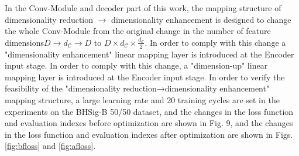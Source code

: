 In the Conv-Module and decoder part of this work, the mapping structure of dimensionality reduction $\to$ dimensionality enhancement is designed to change the whole Conv-Module from the original change in the number of feature dimensions$ D \to d_\mathcal{C} \to D$ to $D \times d_\mathcal{C} \times \frac{d_\mathcal{C}}{2}$. In order to comply with this change a "dimensionality enhancement" linear mapping layer is introduced at the Encoder input stage. In order to comply with this change, a "dimension-up" linear mapping layer is introduced at the Encoder input stage. In order to verify the feasibility of the "dimensionality reduction→dimensionality enhancement" mapping structure, a large learning rate and 20 training cycles are set in the experiments on the BHSig-B 50/50 dataset, and the changes in the loss function and evaluation indexes before optimization are shown in Fig. 9, and the changes in the loss function and evaluation indexes after optimization are shown in Figs. \ref{fig:bfloss} and \ref{fig:afloss}.

